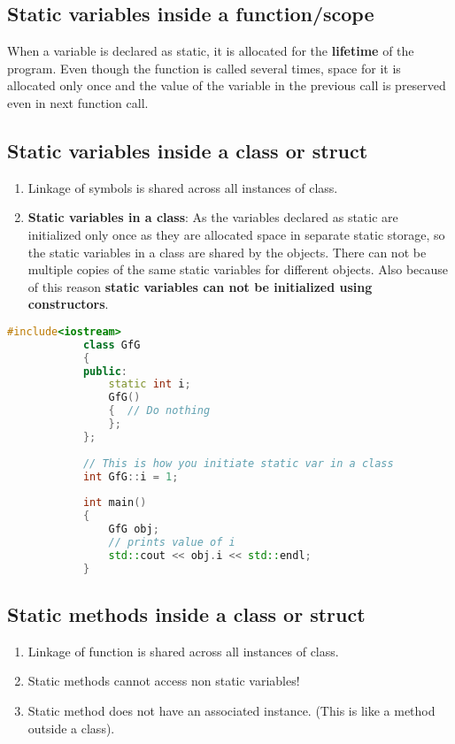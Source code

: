 \documentclass{article}
\begin{document}
    \subsection{Static variables inside a function/scope}
        When a variable is declared as static, it is allocated for the \textbf{lifetime} of the program. Even though the function is called several times, space for it is allocated only once and the value of the variable in the previous call is preserved even in next function call. 
    
    \subsection{Static variables inside a class or struct}
        \begin{enumerate}
            \item Linkage of symbols is shared across all instances of class.
            \item \textbf{Static variables in a class}: As the variables declared as static are initialized only once as they are allocated space in separate static storage, so the static variables in a class are shared by the objects. There can not be multiple copies of the same static variables for different objects. Also because of this reason \textbf{static variables can not be initialized using constructors}.
        \end{enumerate}
    
        \begin{lstlisting}[language=C++, caption=Static example]
            #include<iostream>
            class GfG
            {
            public:
                static int i;
                GfG()
                {  // Do nothing
                };
            };
              
            // This is how you initiate static var in a class
            int GfG::i = 1;   
            
            int main()
            {
                GfG obj;
                // prints value of i
                std::cout << obj.i << std::endl; 
            }
        \end{lstlisting}

    \subsection{Static methods inside a class or struct}
        \begin{enumerate}
        \item Linkage of function is shared across all instances of class.
        \item Static methods cannot access non static variables!
        \item Static method does not have an associated instance. (This is like a method outside a class).
        \end{enumerate}
        
\end{document}
